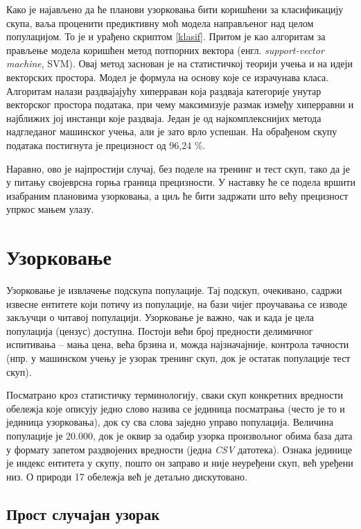 \documentclass[a4paper]{article}
\begin{document}
Како је најављено да ће планови узорковања бити коришћени за класификацију скупа, ваља проценити предиктивну моћ модела направљеног над целом популацијом. То је и урађено скриптом \ref{klasif}. Притом је као алгоритам за прављење модела коришћен метод потпорних вектора (енгл. \textit{support-vector machine}, SVM). Овај метод заснован је на статистичкој теорији учења и на идеји векторских простора. Модел је формула на основу које се израчунава класа. Алгоритам налази раздвајајућу хиперраван која раздваја категорије унутар векторског простора података, при чему максимизује размак између хиперравни и најближих јој инстанци које раздваја. Један је од најкомплекснијих метода надгледаног машинског учења, али је зато врло успешан. На обрађеном скупу података постигнута је прецизност од 96,24 \%.



Наравно, ово је најпростији случај, без поделе на тренинг и тест скуп, тако да је у питању својеврсна горња граница прецизности. У наставку ће се подела вршити изабраним плановима узорковања, а циљ ће бити задржати што већу прецизност упркос мањем улазу.

\section{Узорковање}

Узорковање је извлачење подскупа популације. Тај подскуп, очекивано, садржи извесне ентитете који потичу из
популације, на бази чијег проучавања се изводе закључци о читавој популацији. Узорковање је важно, чак и када је цела популација (цензус) доступна.\cite{lohr} Постоји већи број предности делимичног испитивања -- мања цена, већа брзина и, можда најзначајније, контрола тачности (нпр. у машинском учењу је узорак тренинг скуп, док је остатак популације тест скуп).

Посматрано кроз статистичку терминологију, сваки скуп конкретних вредности обележја које описују једно слово назива се јединица посматрања (често је то и јединица узорковања), док су сва слова заједно управо популација. Величина популације је 20.000, док је оквир за одабир узорка произвољног обима база дата у формату запетом раздвојених вредности (једна \textit{CSV} датотека). Ознака јединице је индекс ентитета у скупу, пошто он заправо и није неуређени скуп, већ уређени низ. О природи 17 обележја већ је детаљно дискутовано.

\subsection{Прост случајан узорак}
\end{document}
